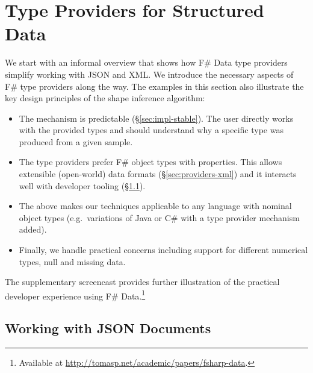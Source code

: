 \documentclass[pldi-cameraready]{sigplanconf-pldi16}
\newcommand{\kvd}[1]{\textnormal{\textcolor{kvdclr}{\sffamily #1}}}
\begin{document}
\section{Type Providers for Structured Data}
\label{sec:providers}

We start with an informal overview that shows how F\# Data type providers simplify working with
JSON and XML. We introduce the necessary aspects of F\# type providers along the way. The examples
in this section also illustrate the key design principles of the shape inference algorithm:

\begin{itemize}
\item The mechanism is predictable (\S\ref{sec:impl-stable}). The user directly works with the
  provided types and should understand why a specific type was produced from a given sample.

\item The type providers prefer F\# object types with properties. This allows extensible
  (open-world) data formats (\S\ref{sec:providers-xml}) and it interacts well with developer tooling
  (\S\ref{sec:providers-json}).

\item The above makes our techniques applicable to any language with nominal
  object types (e.g.~variations of Java or C\# with a type provider mechanism added).

\item Finally, we handle practical concerns including
  support for different numerical types, \kvd{null} and missing data.
\end{itemize}

\noindent
The supplementary screencast provides further illustration of the practical developer
experience using F\# Data.\footnote{Available at \url{http://tomasp.net/academic/papers/fsharp-data}.}


\subsection{Working with JSON Documents}
\label{sec:providers-json}
\end{document}
